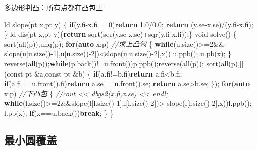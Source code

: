 \documentclass[
]{article}
\newenvironment{Shaded}{}{}
\newcommand{\AttributeTok}[1]{\textcolor[rgb]{0.49,0.56,0.16}{#1}}
\newcommand{\CommentTok}[1]{\textcolor[rgb]{0.38,0.63,0.69}{\textit{#1}}}
\newcommand{\ControlFlowTok}[1]{\textcolor[rgb]{0.00,0.44,0.13}{\textbf{#1}}}
\newcommand{\DataTypeTok}[1]{\textcolor[rgb]{0.56,0.13,0.00}{#1}}
\newcommand{\DecValTok}[1]{\textcolor[rgb]{0.25,0.63,0.44}{#1}}
\newcommand{\FloatTok}[1]{\textcolor[rgb]{0.25,0.63,0.44}{#1}}
\newcommand{\KeywordTok}[1]{\textcolor[rgb]{0.00,0.44,0.13}{\textbf{#1}}}
\newcommand{\NormalTok}[1]{#1}
\begin{document}
多边形判凸：所有点都在凸包上

\begin{Shaded}
\begin{Highlighting}[]
\NormalTok{ld slope(pt x,pt y)}
\NormalTok{\{}
    \ControlFlowTok{if}\NormalTok{(y.fi{-}x.fi==}\DecValTok{0}\NormalTok{)}\ControlFlowTok{return} \FloatTok{1.0}\NormalTok{/}\FloatTok{0.0}\NormalTok{;}
    \ControlFlowTok{return}\NormalTok{ (y.se{-}x.se)/(y.fi{-}x.fi);}
\NormalTok{\}}
\NormalTok{ld dis(pt x,pt y)\{}\ControlFlowTok{return}\NormalTok{ sqrt(sqr(y.se{-}x.se)+sqr(y.fi{-}x.fi));\}}
\DataTypeTok{void}\NormalTok{ solve()}
\NormalTok{\{}
\NormalTok{    sort(all(p)),unq(p);}
    \ControlFlowTok{for}\NormalTok{(}\KeywordTok{auto}\NormalTok{ x:p) }\CommentTok{//求上凸包}
\NormalTok{    \{}
        \ControlFlowTok{while}\NormalTok{(u.size()\textgreater{}=}\DecValTok{2}\NormalTok{\&\&}
\NormalTok{            slope(u[u.size(){-}}\DecValTok{1}\NormalTok{],u[u.size(){-}}\DecValTok{2}\NormalTok{])\textless{}slope(u[u.size(){-}}\DecValTok{2}\NormalTok{],x))}
\NormalTok{                u.ppb();}
\NormalTok{        u.pb(x);}
\NormalTok{    \}}
\NormalTok{    reverse(all(p));}\ControlFlowTok{while}\NormalTok{(p.back()!=u.front())p.ppb();reverse(all(p));}
\NormalTok{    sort(all(p),[](}\AttributeTok{const}\NormalTok{ pt \&a,}\AttributeTok{const}\NormalTok{ pt \&b)}
\NormalTok{    \{}
        \ControlFlowTok{if}\NormalTok{(a.fi!=b.fi)}\ControlFlowTok{return}\NormalTok{ a.fi\textless{}b.fi;}
        \ControlFlowTok{if}\NormalTok{(a.fi==u.front().fi)}\ControlFlowTok{return}\NormalTok{ a.se==u.front().se;}
        \ControlFlowTok{return}\NormalTok{ a.se\textgreater{}b.se;}
\NormalTok{    \});}
    \ControlFlowTok{for}\NormalTok{(}\KeywordTok{auto}\NormalTok{ x:p) }\CommentTok{//下凸包}
\NormalTok{    \{}
        \CommentTok{//cout \textless{}\textless{} dbgs2(x.fi,x.se) \textless{}\textless{} endl;}
        \ControlFlowTok{while}\NormalTok{(l.size()\textgreater{}=}\DecValTok{2}\NormalTok{\&\&slope(l[l.size(){-}}\DecValTok{1}\NormalTok{],l[l.size(){-}}\DecValTok{2}\NormalTok{])\textgreater{}}
\NormalTok{            slope(l[l.size(){-}}\DecValTok{2}\NormalTok{],x))l.ppb();}
\NormalTok{        l.pb(x);}
        \ControlFlowTok{if}\NormalTok{(x==u.back())}\ControlFlowTok{break}\NormalTok{;}
\NormalTok{    \}}
\NormalTok{\}}
\end{Highlighting}
\end{Shaded}

\hypertarget{ux6700ux5c0fux5706ux8986ux76d6}{%
\subsection{最小圆覆盖}\label{ux6700ux5c0fux5706ux8986ux76d6}}
\end{document}
